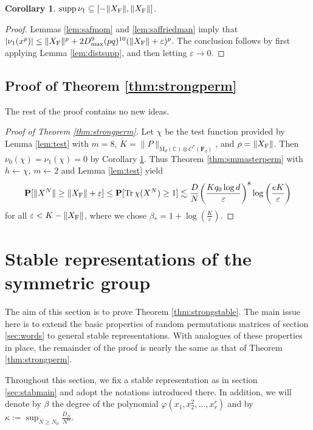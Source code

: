 \documentclass[10pt,reqno]{amsart}
\newtheorem{cor}[thm]{Corollary}
\theoremstyle{definition}
\theoremstyle{remark}
\numberwithin{equation}{section}
\numberwithin{figure}{section}
\numberwithin{table}{section}
\newcommand{\supp}{\mathop{\mathrm{supp}}}
\newcommand{\tr}{\mathop{\mathrm{Tr}}}
\begin{document}

\begin{cor}
\label{cor:safsupp}
$\supp \nu_1 \subseteq [-\|X_{\rm F}\|,\|X_{\rm F}\|]$.
\end{cor}

\begin{proof}
Lemmas \ref{lem:safmom} and \ref{lem:saffriedman} imply that
$|\nu_1(x^p)| \le \|X_{\rm F}\|^p + 2 D_{\rm max}^9 (pq)^{10} (\|X_{\rm 
F}\|+\varepsilon)^p$. The conclusion follows by first applying Lemma 
\ref{lem:distsupp}, and then letting $\varepsilon\to 0$.
\end{proof}

\subsection{Proof of Theorem \ref{thm:strongperm}}

The rest of the proof contains no new ideas.

\begin{proof}[Proof of Theorem \ref{thm:strongperm}]
Let $\chi$ be the test function provided by Lemma \ref{lem:test} with 
$m=8$, $K=\|P\|_{\mathrm{M}_d(\mathbb{C})\otimes C^*(\mathbf{F}_d)}$, and 
$\rho=\|X_{\rm F}\|$. Then $\nu_0(\chi)=\nu_1(\chi)=0$ by Corollary 
\ref{cor:safsupp}.
Thus Theorem
\ref{thm:smmasterperm} with $h\leftarrow\chi$,
$m\leftarrow 2$ and Lemma \ref{lem:test} yield
$$
	\mathbf{P}[\|X^N\|\ge\|X_{\rm F}\|+\varepsilon]
	\le
	\mathbf{P}[\tr \chi(X^N) \ge 1]
	\lesssim 
	\frac{D}{N}
	\bigg(\frac{Kq_0\log d}{\varepsilon}\bigg)^{8}
	\log
	\bigg(\frac{eK}{\varepsilon}\bigg)
$$
for all $\varepsilon < K-\|X_{\rm F}\|$,
where we chose $\beta_*=1+\log(\frac{K}{\varepsilon})$.
\end{proof}


\section{Stable representations of the symmetric group}
\label{sec:stable}

The aim of this section is to prove Theorem \ref{thm:strongstable}. The 
main issue here is to extend the basic properties of random permutations 
matrices of section \ref{sec:words} to general stable representations. 
With analogues of these properties in place, the remainder of the
proof is nearly the same as that of Theorem \ref{thm:strongperm}. 

Throughout this section, we fix a stable representation as in section 
\ref{sec:stabmain} and adopt the notations introduced there. In addition, 
we will denote by $\beta$ the degree of the polynomial 
$\varphi(x_1,x_2^2,\ldots,x_r^r)$ and by $\kappa:= \sup_{N\ge N_0}\frac{D_N}{N^\alpha}$.
\end{document}
